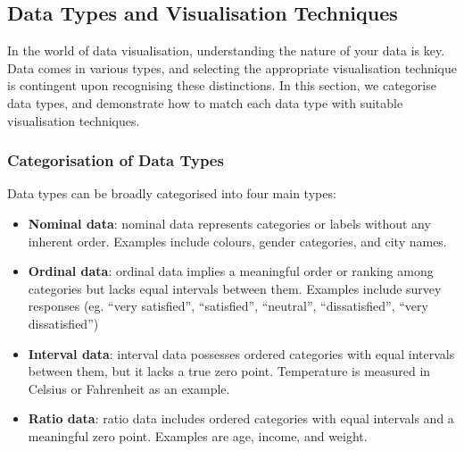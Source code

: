 \documentclass{article}\usepackage[]{graphicx}\usepackage[]{xcolor}
\begin{document}
\subsection{Data Types and Visualisation Techniques}
In the world of data visualisation, understanding the nature of your data is key. Data comes in various types, and selecting the appropriate visualisation technique is contingent upon recognising these distinctions. In this section, we categorise data types, and demonstrate how to match each data type with suitable visualisation techniques.

\subsubsection{Categorisation of Data Types}
Data types can be broadly categorised into four main types: 
\begin{itemize}
    \item \textbf{Nominal data}: nominal data represents categories or labels without any inherent order. Examples include colours, gender categories, and city names. 
    \item \textbf{Ordinal data}: ordinal data implies a meaningful order or ranking among categories but lacks equal intervals between them. Examples include survey responses (eg. “very satisfied”, “satisfied”, “neutral”, “dissatisfied”, “very dissatisfied”)
    \item \textbf{Interval data}: interval data possesses ordered categories with equal intervals between them, but it lacks a true zero point. Temperature is measured in Celsius or Fahrenheit as an example. 
    \item \textbf{Ratio data}: ratio data includes ordered categories with equal intervals and a meaningful zero point. Examples are age, income, and weight. 
\end{itemize}
\end{document}
